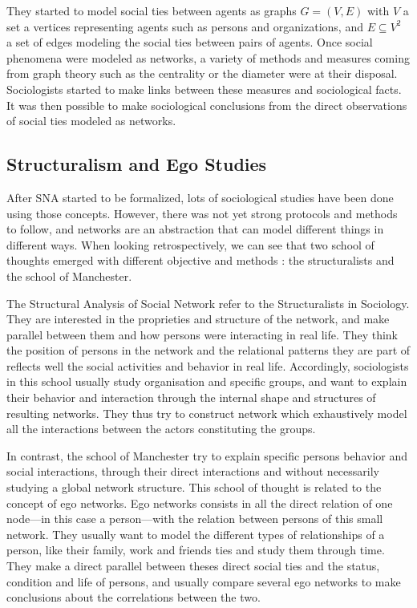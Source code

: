 They started to model social ties between agents as graphs $G = (V, E)$ with $V$ a set a vertices representing agents such as persons and organizations, and $E \subseteq V^2$ a set of edges modeling the social ties between pairs of agents.
Once social phenomena were modeled as networks, a variety of methods and measures coming from graph theory such as the centrality or the diameter were at their disposal. Sociologists started to make links between these measures and sociological facts. It was then possible to make sociological conclusions from the direct observations of social ties modeled as networks.



\subsection{Structuralism and Ego Studies}

After SNA started to be formalized, lots of sociological studies have been done using those concepts. However, there was not yet strong protocols and methods to follow, and networks are an abstraction that can model different things in different ways. When looking retrospectively, we can see that two school of thoughts emerged with different objective and methods : the structuralists and the school of Manchester.

The Structural Analysis of Social Network refer to the Structuralists in Sociology. They are interested in the proprieties and structure of the network, and make parallel between them and how persons were interacting in real life. They think the position of persons in the network and the relational patterns they are part of reflects well the  social activities and behavior in real life. Accordingly, sociologists in this school usually study organisation and specific groups, and want to explain their behavior and interaction through the internal shape and structures of resulting networks. They thus try to construct network which exhaustively model all the interactions between the actors constituting the groups.

In contrast, the school of Manchester try to explain specific persons behavior and social interactions, through their direct interactions and without necessarily studying a global network structure. This school of thought is related to the concept of ego networks. Ego networks consists in all the direct relation of one node---in this case a person---with the relation between persons of this small network. They usually want to model the different types of relationships of a person, like their family, work and friends ties and study them through time. They make a direct parallel between theses direct social ties and the status, condition and life of persons, and usually compare several ego networks to make conclusions about the correlations between the two.

